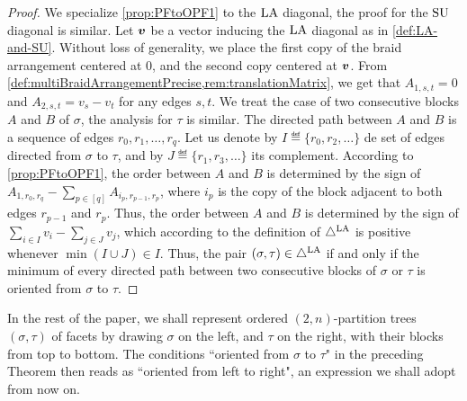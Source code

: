 \begin{proof}
We specialize \cref{prop:PFtoOPF1} to the $\mathrm{LA}$ diagonal, the proof for the $\mathrm{SU}$ diagonal is similar. 
Let $\boldsymbol{v}$ be a vector inducing the $\mathrm{LA}$ diagonal as in \cref{def:LA-and-SU}.
Without loss of generality, we place the first copy of the braid arrangement centered at $0$, and the second copy centered at $\boldsymbol{v}$.
From \cref{def:multiBraidArrangementPrecise,rem:translationMatrix}, we get that $A_{1,s,t}=0$ and $A_{2,s,t}=v_s-v_t$ for any edges $s,t$.
We treat the case of two consecutive blocks $A$ and $B$ of $\sigma$, the analysis for $\tau$ is similar. 
The directed path between $A$ and $B$ is a sequence of edges $r_0,r_1,\dots,r_q$.  
Let us denote by $I \eqdef \{r_0,r_2,\dots\}$ de set of edges directed from $\sigma$ to $\tau$, and by $J \eqdef \{r_1,r_3,\dots\}$ its complement. 
According to \cref{prop:PFtoOPF1}, the order between $A$ and $B$ is determined by the sign of $A_{1,r_0,r_q}- \sum_{p \in [q]} A_{i_p,r_{p-1},r_p}$, where $i_p$ is the copy of the block adjacent to both edges $r_{p-1}$ and $r_p$. 
Thus, the order between $A$ and $B$ is determined by the sign of $\sum_{i \in I} v_i - \sum_{j \in J} v_j$, which according to the definition of $\triangle^{\mathrm{LA}}$ is positive whenever $\min(I\cup J) \in I$. 
Thus, the pair $(\sigma,\tau) \in \triangle^{\mathrm{LA}}$ if and only if the minimum of every directed path between two consecutive blocks of $\sigma$ or $\tau$ is oriented from $\sigma$ to $\tau$. 
\end{proof}

In the rest of the paper, we shall represent ordered $(2,n)$-partition trees $(\sigma,\tau)$ of facets by drawing $\sigma$ on the left, and $\tau$ on the right, with their blocks from top to bottom. 
The conditions ``oriented from $\sigma$ to $\tau$" in the preceding Theorem then reads as ``oriented from left to right", an expression we shall adopt from now on. 

